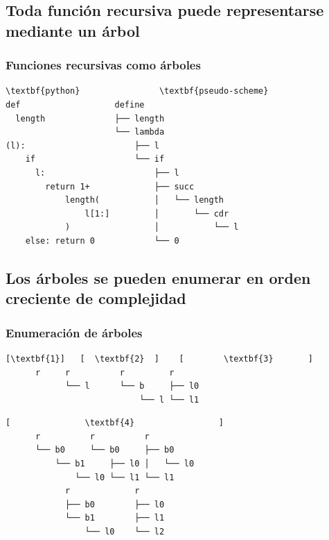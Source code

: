 \documentclass[xcolor=x11names,compress]{beamer}
\renewcommand{\(}{\begin{columns}}
\renewcommand{\)}{\end{columns}}
\newcommand{\<}[1]{\begin{column}{#1}}
\renewcommand{\>}{\end{column}}
\begin{document}
\subsection{Toda función recursiva puede representarse mediante un árbol}
\begin{frame}[fragile]
    \frametitle{Funciones recursivas como árboles}
    \codeLengthRecursionSmall
\begin{Verbatim}[commandchars=\\\{\},codes={\catcode`$=3\catcode`_=8}]
\textbf{python}                \textbf{pseudo-scheme}
def                   define                    
  length              ├── length                
                      └── lambda                
(l):                      ├── l                 
    if                    └── if                
      l:                      ├── l             
        return 1+             ├── succ          
            length(           │   └── length    
                l[1:]         │       └── cdr   
            )                 │           └── l 
    else: return 0            └── 0             
\end{Verbatim}
\end{frame}

\subsection{Los árboles se pueden enumerar en orden creciente de complejidad \pause}
\begin{frame}[fragile]
    \frametitle{Enumeración de árboles}
\begin{Verbatim}[commandchars=\\\{\},codes={\catcode`$=3\catcode`_=8}]
     [\textbf{1}]   [  \textbf{2}  ]    [        \textbf{3}       ]
      r     r          r         r
            └── l      └── b     ├── l0
                           └── l └── l1
\end{Verbatim}

\pause

\begin{Verbatim}[commandchars=\\\{\},codes={\catcode`$=3\catcode`_=8}]
     [               \textbf{4}                 ]
      r          r          r         
      └── b0     └── b0     ├── b0    
          └── b1     ├── l0 │   └── l0
              └── l0 └── l1 └── l1    
            r             r
            ├── b0        ├── l0
            └── b1        ├── l1
                └── l0    └── l2
\end{Verbatim}



\end{frame}
\end{document}
